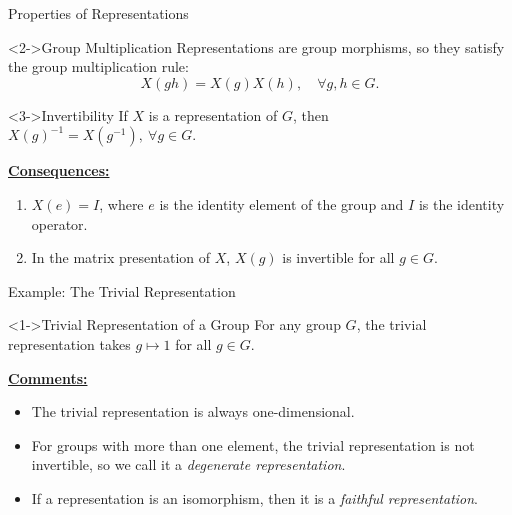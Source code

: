\documentclass[compress,aspectratio=169,10pt,usenames,dvipsnames]{beamer}
\begin{document}
\begin{frame}{Properties of Representations}


\begin{block}<2->{Group Multiplication}
  Representations are group morphisms, so they satisfy the group multiplication rule:
  \begin{equation*}
      X(gh) = X(g)X(h), \quad \forall g,h\in G.
  \end{equation*}
\end{block}

\vfill

\begin{block}<3->{Invertibility}
  If $X$ is a representation of $G$, then $X(g)^{-1} = X(g^{-1}),\ \forall g\in G$.
\end{block}

\vfill

\underline{\bfseries Consequences:}
\begin{enumerate}
  \item<5-> $X(e) = I$, where $e$ is the identity element of the group and $I$ is the identity operator.
  \item<6-> In the matrix presentation of $X$, $X(g)$ is invertible for all $g\in G$.
\end{enumerate} 

\vfill

\end{frame}


\begin{frame}{Example: The Trivial Representation}

\begin{block}<1->{Trivial Representation of a Group}
  For any group $G$, the trivial representation takes $g\mapsto 1$ for all $g\in G$.
\end{block}


\underline{\bfseries Comments:}

\begin{itemize}
  \item<2-> The trivial representation is always one-dimensional.
  \item<3-> For groups with more than one element, the trivial representation is not invertible, so we call it a \textcolor{CPgold}{\textit{degenerate representation}}.
  \item<4-> If a representation is an isomorphism, then it is a \textcolor{CPgold}{\textit{faithful representation}}.
\end{itemize}

\vfill



\end{frame}
\end{document}
